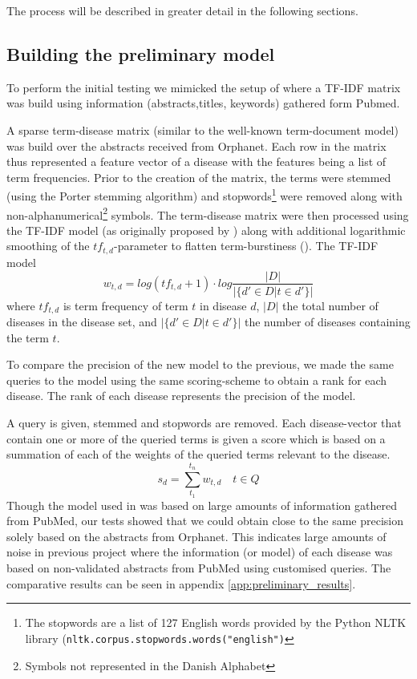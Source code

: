 \documentclass[10pt,letterpaper,final]{article}
\begin{document}
The process will be described in greater detail in the following
sections.


\subsection{Building the preliminary model}
To perform the initial testing we mimicked the setup of
\cite{jensenandersen} where a TF-IDF matrix was build using information
(abstracts,titles, keywords) gathered form Pubmed.

A sparse term-disease matrix (similar to the well-known term-document
model) was build over the abstracts received from Orphanet. Each row in
the matrix thus represented a feature vector of a disease with the
features being a list of term frequencies. Prior to the creation of the
matrix, the terms were stemmed (using the Porter stemming algorithm) and
stopwords\footnote{The stopwords are a list of 127 English words provided
by the Python NLTK library
(\texttt{nltk.corpus.stopwords.words("english")}} were removed along
with non-alphanumerical\footnote{Symbols not represented in the Danish
Alphabet} symbols. The term-disease matrix were then processed using the
TF-IDF model (as originally proposed by \cite{tfidf}) along with
additional logarithmic smoothing of the $tf_{t,d}$-parameter to flatten
term-burstiness (\cite{burstiness}). The TF-IDF model
\[
w_{t,d} = log(tf_{t,d}+1)\cdot log\frac{|D|}{|\{d'\in D|t\in d'\}|}
\]
where $tf_{t,d}$ is term frequency of term $t$ in disease $d$, $|D|$ 
the total number of diseases in the disease set, and $|\{d'\in D|t\in
d'\}|$ the number of diseases containing the term $t$.

To compare the precision of the new model to the previous, we made the
same queries to the model using the same scoring-scheme to obtain a rank
for each disease. The rank of each disease represents the precision of
the model.

A query is given, stemmed and stopwords are removed. Each
disease-vector that contain one or more of the queried terms is given a
score which is based on a summation of each of the weights of the
queried terms relevant to the disease.
\[
s_{d} = \displaystyle\sum\limits_{t_1}^{t_n} w_{t,d}\quad t \in Q
\]
Though the model used in \cite{jensenandersen} was based on large
amounts of information gathered from PubMed, our tests showed that we
could obtain close to the same precision solely based on the abstracts
from Orphanet. This indicates large amounts of noise in previous project
where the information (or model) of each disease was based on
non-validated abstracts from PubMed using customised queries. The
comparative results can be seen in appendix
\ref{app:preliminary_results}.
\end{document}
